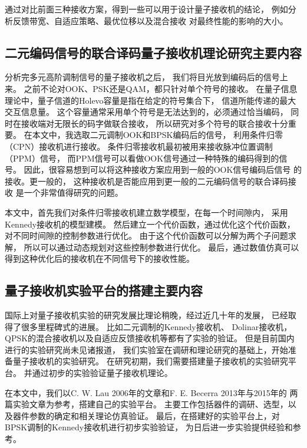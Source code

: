 通过对比前面三种接收方案，得到一些可以用于设计量子接收机的结论，
例如分析反馈带宽、自适应策略、最优位移以及混合接收
对最终性能的影响的大小。

\subsection{二元编码信号的联合译码量子接收机理论研究主要内容}

分析完多元高阶调制信号的量子接收机之后，
我们将目光放到编码后的信号上来。
之前不论对OOK、PSK还是QAM，都只针对单个符号的接收。
在量子信息理论中，量子信道的Holevo容量是指在给定的符号集合下，
信道所能传递的最大交互信息量。
这个容量通常采用单个符号是无法达到的，必须通过恰当编码，
同时在接收端对无限长的码字做联合接收，
所以研究对多个符号的联合接收十分重要\cite{holevo1996capacity,hausladen1996classical}。
在本文中，我选取二元调制OOK和BPSK编码后的信号，
利用条件归零（CPN）接收机进行接收。
条件归零接收机最初被用来接收脉冲位置调制（PPM）信号\cite{dolinar1982near}，
而PPM信号可以看做OOK信号通过一种特殊的编码得到的信号。
因此，很容易想到可以将这种接收方案应用到一般的OOK信号编码后信号
的接收。更一般的，
这种接收机是否能应用到更一般的二元编码信号的联合译码接收
是一个非常值得研究的问题。

本文中，首先我们对条件归零接收机建立数学模型，在每一个时间隙内，
采用Kennedy接收机的模型建模。
然后建立一个代价函数，通过优化这个代价函数，
对不同时间隙的控制参数进行优化。
由于这个代价函数可以分解为两个子问题求解，
所以可以通过动态规划对这些控制参数进行优化。
最后，通过数值仿真可以得到这种优化后的接收机在不同信号下的接收性能。

\subsection{量子接收机实验平台的搭建主要内容}
国际上对量子接收机实验的研究发展比理论稍晚，经过近几十年的发展，
已经取得了很多里程碑式的进展。
比如二元调制的Kennedy接收机\cite{lau2006binary}、
Dolinar接收机\cite{lau2006binary,cook2007optical}，
QPSK的混合接收机以及自适应反馈接收机等都有了实验的验证\cite{muller2012quadrature,becerra2013experimental}。
但是目前国内进行的实验研究尚未见诸报道，
我们实验室在调研和理论研究的基础上，开始准备量子接收机的实验研究。
在研究初期，我们需要搭建量子接收机的实验研究平台。
并通过初步的实验验证量子接收机理论。

在本文中，我们以C. W. Lau 2006年的文章和F. E. Becerra 2013年与2015年的
两篇实验文章为参考\cite{lau2006binary,becerra2013experimental,becerra2015photon}，搭建自己的实验平台。
主要工作包括器件的调研、选型，以及器件参数的确定和相关理论仿真验证。
最后，在搭建好的实验平台上，对BPSK调制的Kennedy接收机进行初步实验验证，
为日后进一步实验提供经验和参考。
 


